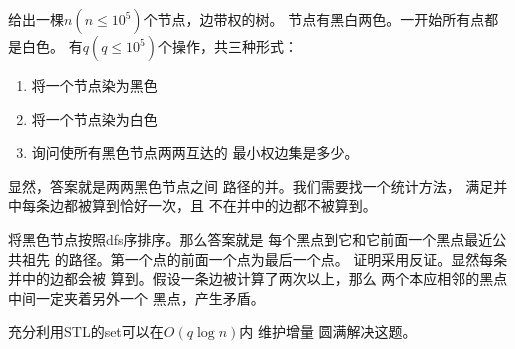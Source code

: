 \begin{prob}
	给出一棵$n(n \le 10^5)$个节点，边带权的树。
	节点有黑白两色。一开始所有点都是白色。
	有$q(q \le 10^5)$个操作，共三种形式：
	\begin{enumerate}
		\item 将一个节点染为黑色
		\item 将一个节点染为白色
		\item 询问使所有黑色节点两两互达的
			最小权边集是多少。
	\end{enumerate}
\end{prob}

\begin{sol}
	显然，答案就是两两黑色节点之间
	路径的并。我们需要找一个统计方法，
	满足并中每条边都被算到恰好一次，且
	不在并中的边都不被算到。\par
	将黑色节点按照dfs序排序。那么答案就是
	每个黑点到它和它前面一个黑点最近公共祖先
	的路径。第一个点的前面一个点为最后一个点。
	证明采用反证。显然每条并中的边都会被
	算到。假设一条边被计算了两次以上，那么
	两个本应相邻的黑点中间一定夹着另外一个
	黑点，产生矛盾。\par
	充分利用STL的set可以在$O(q \log n)$内
	维护增量
	圆满解决这题。
\end{sol}
